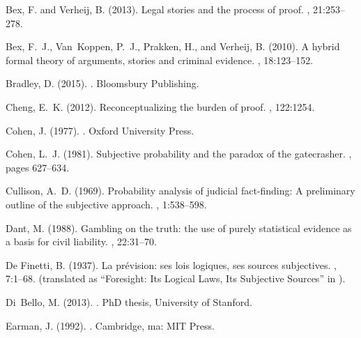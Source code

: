 \documentclass[10pt,leqno]{article}
\begin{document}
\begin{thebibliography}{}
Bex, F. and Verheij, B. (2013).
\newblock Legal stories and the process of proof.
, 21:253--278.

Bex, F.~J., Van~Koppen, P.~J., Prakken, H., and Verheij, B. (2010).
\newblock A hybrid formal theory of arguments, stories and criminal evidence.
, 18:123--152.

Bradley, D. (2015).
.
\newblock Bloomsbury Publishing.

Cheng, E.~K. (2012).
\newblock Reconceptualizing the burden of proof.
, 122:1254.

Cohen, J. (1977).
.
\newblock Oxford University Press.

Cohen, L.~J. (1981).
\newblock Subjective probability and the paradox of the gatecrasher.
, pages 627--634.

Cullison, A.~D. (1969).
\newblock Probability analysis of judicial fact-finding: A preliminary outline
  of the subjective approach.
, 1:538--598.

Dant, M. (1988).
\newblock Gambling on the truth: the use of purely statistical evidence as a
  basis for civil liability.
, 22:31--70.

{De Finetti}, B. (1937).
\newblock La pr{\'e}vision: ses lois logiques, ses sources subjectives.
, 7:1--68.
\newblock (translated as ``Foresight: Its Logical Laws, Its Subjective
  Sources'' in \citep{Kyburg1964studies}).

Di~Bello, M. (2013).
.
\newblock PhD thesis, University of Stanford.

Earman, J. (1992).
.
\newblock Cambridge, ma: MIT Press.


\end{thebibliography}
\end{document}
